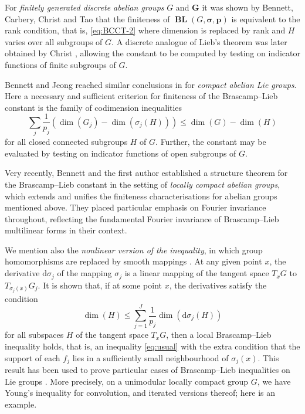 \documentclass[12pt,twoside,a4paper]{amsart}
\theoremstyle{definition}
\theoremstyle{remark}
\numberwithin{equation}{section}
\newcommand{\BL}{\operatorname{\mathbf{BL}}}
\newcommand{\bss}{\boldsymbol{\sigma}}
\newcommand{\bsp}{\boldsymbol{p}}
\newcommand{\bsG}{\boldsymbol{G}}
\newcommand{\lpar}{\left( }
\newcommand{\rpar}{\right) }
\begin{document}
For \emph{finitely generated discrete abelian groups} $G$ and $\bsG$  it was shown by Bennett, Carbery, Christ and Tao \cite{BCCT10} that the finiteness of $\BL(G,\bss,\bsp)$ is equivalent to the rank condition, that is, \eqref{eq:BCCT-2} where dimension is replaced by rank and $H$ varies over all subgroups of $G$.
A discrete analogue of Lieb's theorem was later obtained by Christ \cite{Chr13}, allowing the constant to be computed by testing on indicator functions of finite subgroups of $G$.   


Bennett and Jeong reached similar conclusions in \cite[Theorems 4.1 and 5.1]{BJ22} for \emph{compact abelian Lie groups}.
Here a necessary and sufficient criterion for finiteness of the Brascamp--Lieb constant is the family of codimension inequalities
\begin{equation}\label{eq:codimension-condition-group}
\sum_j \frac{1}{p_j} \lpar \dim(G_j)  - \dim( \sigma_j (H) ) \rpar  
\leq  \dim(G) - \dim(H)
\end{equation}
for all closed connected subgroups $H$ of $G$. 
Further, the constant may be evaluated by testing on indicator functions of open subgroups of $G$.

Very recently, Bennett and the first author \cite{BC25} established a structure theorem for the Brascamp--Lieb constant in the setting of \emph{locally compact abelian groups}, which extends and unifies the finiteness characterisations for abelian groups mentioned above. 
They placed particular emphasis on Fourier invariance throughout, reflecting the fundamental Fourier invariance of Brascamp–Lieb multilinear forms in their context. 


We mention also the \emph{nonlinear version of the inequality}, in which group homomorphisms are replaced by smooth mappings  \cite{BBBCF20}.
At any given point $x$, the derivative $\mathrm{d}\sigma_j$ of the mapping $\sigma_j$ is a linear mapping of the tangent space $T_xG$ to $T_{\sigma_j(x)}G_j$.
It is shown that, if at some point $x$, the derivatives satisfy the condition
\[
\dim(H)  \leq \sum^J_{j=1}\frac{1}{p_j} \dim(\mathrm{d}\sigma_{j}(H))
\]
for all subspaces $H$ of the tangent space $T_xG$, then a local Brascamp--Lieb inequality holds, that is, an inequality \eqref{eq:usual} with the extra condition that the support of each $f_j$ lies in a sufficiently small neighbourhood of $\sigma_j(x)$.
This result has been used to prove particular cases of Brascamp--Lieb inequalities on Lie groups \cite{CMMP19}.
More precisely, on a unimodular locally compact group $G$, we have Young's inequality for convolution, and iterated versions thereof; here is an example.  
\end{document}
